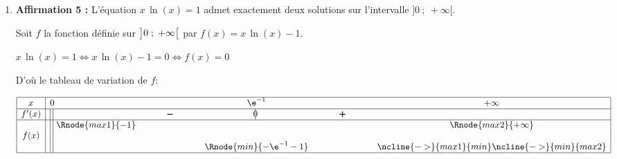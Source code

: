 \begin{enumerate}
\begin{enumerate}
Donc, pour tout $x$ de $] - \infty~;~2[$, on a $x\left (\e^{x}-1\right ) \geqslant 0$ donc $g(x) \leqslant x$.








 
  \hfill\textbf{Affirmation 4 vraie}
\end{enumerate}
	
\item \textbf{Affirmation 5 :} 
\og  L'équation $x\, \ln (x) = 1$ admet exactement deux solutions sur l'intervalle $]0~;~ +\infty[$. \fg{}

Soit $f$ la fonction définie sur $\left ]0\;;\;+\infty\strut\right [$ par $f(x)=x\,\ln(x)-1$.

$x\, \ln (x) = 1 \iff x\, \ln (x) - 1 = 0 \iff f(x)=0$


D'où le tableau de variation de $f$:

\begin{center}
{\renewcommand{\arraystretch}{1.1}
\def\esp{\hspace*{2cm}}
\def\hauteur{0pt}
$\begin{array}{|c| l  *4{c}|}
\hline
 x & 0 & \esp & \e^{-1} & \esp & +\infty \\
 \hline
f'(x) & \vline\;\vline &  \pmb{-} & \vline\hspace{-2.7pt}0 & \pmb{+} & \\  
\hline
  & \vline\;\vline~\Rnode{max1}{-1}  &  &  &  & \Rnode{max2}{+\infty} \\
f(x) &\vline\;\vline &  & & &  \rule{0pt}{\hauteur} \\
 & \vline\;\vline & &   \Rnode{min}{-\e^{-1}-1} & & \rule{0pt}{\hauteur}
\ncline{->}{max1}{min} \ncline{->}{min}{max2}\\
\hline
\end{array}$
}
\end{center}	


\end{enumerate}
